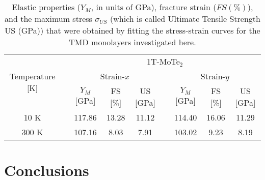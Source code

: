 \documentclass[a4paper,fleqn]{cas-sc}
\begin{document}
\begin{table*}[]
		\begin{tabular}{clccclccc}
			\hline
			\multicolumn{1}{c}{\multirow{3}{*}{Temperature [K]}} & \multicolumn{1}{l}{} &                                                                                                      \multicolumn{7}{c}{1T-MoTe$_2$}                                                                                                      \\ \cline{3-9}
			                  \multicolumn{1}{c}{}                   & \multicolumn{1}{l}{} &                                     \multicolumn{3}{c}{ Strain-$x$}                                      & \multicolumn{1}{l}{} &                                      \multicolumn{3}{c}{Strain-$y$}                                      \\ \cline{3-5}\cline{7-9}
			                  \multicolumn{1}{c}{}                   & \multicolumn{1}{l}{} & \multicolumn{1}{c}{$Y_M$ {[}GPa{]}} & \multicolumn{1}{c}{FS {[}\%{]}} & \multicolumn{1}{c}{US {[}GPa{]}} & \multicolumn{1}{l}{} & \multicolumn{1}{c}{$Y_M$ {[}GPa{]}} & \multicolumn{1}{c}{FS {[}\%{]}} & \multicolumn{1}{c}{US {[}GPa{]}} \\ \cline{1-1}\cline{3-5}\cline{7-9}
			                          10 K                            &                      &               117.86                &              13.28              &              11.12               &                      &               114.40                &              16.06              &              11.29               \\
			                \multicolumn{1}{c}{300 K}                 & \multicolumn{1}{l}{} &     \multicolumn{1}{c}{107.16}      &    \multicolumn{1}{c}{8.03}     &     \multicolumn{1}{c}{7.91}     & \multicolumn{1}{l}{} &     \multicolumn{1}{c}{103.02}      &    \multicolumn{1}{c}{9.23}     &     \multicolumn{1}{c}{8.19}     \\ \hline
		\end{tabular}
	
	
		\caption{Elastic properties ($Y_{M}$, in units of GPa), fracture strain ($FS (\%)$), and the maximum stress $\sigma_{US}$ (which is called Ultimate Tensile Strength US (GPa)) that were obtained by fitting the stress-strain curves for the TMD monolayers investigated here.}
		\label{table:elasprop}
	\end{table*}

\section{Conclusions}
\end{document}
